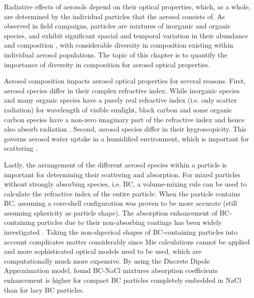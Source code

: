 \documentclass[edeposit,fullpage]{uiucthesis2009}
\begin{document}
Radiative effects of aerosols depend on their optical properties,
which, as a whole, are determined by the individual particles that the
aerosol consists of. As observed in field campaigns, particles are
mixtures of inorganic and organic species, and exhibit significant
spacial and temporal variation in their abundance and composition
\citep{zhang2007ubiquity, bzdek2012single, LASKIN2006260}, with
considerable diversity in composition existing within individual
aerosol populations. The topic of this chapter is to quantify the importance
of diversity in composition for aerosol optical properties.

Aerosol composition impacts aerosol optical properties for several
reasons. First, aerosol species differ in their complex refractive
index. While inorganic species and many organic species have a purely
real refractive index (i.e. only scatter radiation) for wavelength of
visible sunlight, black carbon and some organic carbon species have a
non-zero imaginary part of the refractive index and hence also absorb
radiation \citep{corbin2018brown, Esteve2014, cappa2019light}.
Second, aerosol species differ in their hygroscopicity. This governs
aerosol water uptake in a humidified environment, which is important
for scattering \citep{MichelFlores2012, Zieger2013, Titos2014,
  Titos2016}.

Lastly, the arrangement of the different aerosol species within a
particle is important for determining their scattering and
absorption. For mixed particles without strongly absorbing species,
i.e. BC, a volume-mixing rule can be used to calculate the refractive
index of the entire particle. When the particle contains BC, assuming
a core-shell configuration was proven to be more accurate
\citep{Bond2006} (still assuming sphericity as particle shape). The
absorption enhancement of BC-containing particles due to their
non-absorbing coatings has been widely investigated
\citep{Moffet2009,Liu2017,wu2020light, Fierce2020}. Taking the
non-shperical shapes of BC-containing particles into account
complicates matter considerably since Mie calculations cannot be
applied and more sophisticated optical models need to be used, which
are computationally much more expensive. By using the Discrete Dipole
Approximation model, \citet{scarnato2013effects} found
BC-NaCl mixtures absorption coefficients enhancement is higher for
compact BC particles completely embedded in NaCl than for lacy BC
particles.
\end{document}
